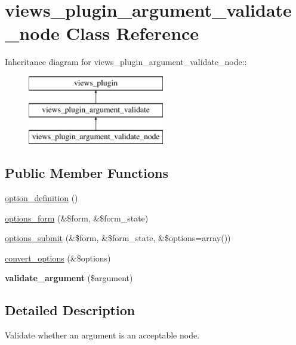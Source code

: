 \hypertarget{classviews__plugin__argument__validate__node}{
\section{views\_\-plugin\_\-argument\_\-validate\_\-node Class Reference}
\label{classviews__plugin__argument__validate__node}
}
Inheritance diagram for views\_\-plugin\_\-argument\_\-validate\_\-node::\begin{figure}[H]
\begin{center}
\leavevmode
\includegraphics[height=3cm]{classviews__plugin__argument__validate__node}
\end{center}
\end{figure}
\subsection*{Public Member Functions}
\begin{DoxyCompactItemize}
\item 
\hyperlink{classviews__plugin__argument__validate__node_ada2195af633d2a7ada68d41104c309aa}{option\_\-definition} ()
\item 
\hyperlink{classviews__plugin__argument__validate__node_a32bc6be973ce19c867ded106753d94e7}{options\_\-form} (\&\$form, \&\$form\_\-state)
\item 
\hyperlink{classviews__plugin__argument__validate__node_a81cd20811df44e2798d085a50902c5a3}{options\_\-submit} (\&\$form, \&\$form\_\-state, \&\$options=array())
\item 
\hyperlink{classviews__plugin__argument__validate__node_ac22f025079c1bd85bae75c522142e779}{convert\_\-options} (\&\$options)
\item 
\hypertarget{classviews__plugin__argument__validate__node_ad8058fa933969f0671dfa4075fe49336}{
{\bfseries validate\_\-argument} (\$argument)}
\label{classviews__plugin__argument__validate__node_ad8058fa933969f0671dfa4075fe49336}

\end{DoxyCompactItemize}


\subsection{Detailed Description}
Validate whether an argument is an acceptable node. 

